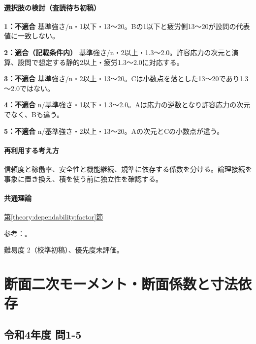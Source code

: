 \paragraph{選択肢の検討（査読待ち初稿）}\mbox{}\par

\noindent\textbf{1：不適合} 基準強さ/n・1以下・13～20。Bの1以下と疲労側13～20が設問の代表値に一致しない。\par

\noindent\textbf{2：適合（記載条件内）} 基準強さ/n・2以上・1.3～2.0。許容応力の次元と演算、設問で想定する静的2以上・疲労1.3～2.0に対応する。\par

\noindent\textbf{3：不適合} 基準強さ/n・2以上・13～20。Cは小数点を落とした13～20であり1.3～2.0ではない。\par

\noindent\textbf{4：不適合} n/基準強さ・1以下・1.3～2.0。Aは応力の逆数となり許容応力の次元でなく、Bも違う。\par

\noindent\textbf{5：不適合} n/基準強さ・2以上・13～20。Aの次元とCの小数点が違う。\par

\paragraph{再利用する考え方} 信頼度と稼働率、安全性と機能継続、規準に依存する係数を分ける。論理接続を事象に置き換え、積を使う前に独立性を確認する。

\paragraph{共通理論} \hyperref[theory:dependability:factor]{第\ref*{theory:dependability:factor}節}

\par 参考：\cite{struct_mit_beam,struct_nims_data,design_faa_2011}。

\par 難易度 2（校準初稿）、優先度未評価。

\section{断面二次モーメント・断面係数と寸法依存}

\subsection{令和4年度 問1-5}
\label{q:r04-reg-basic-1-5}

